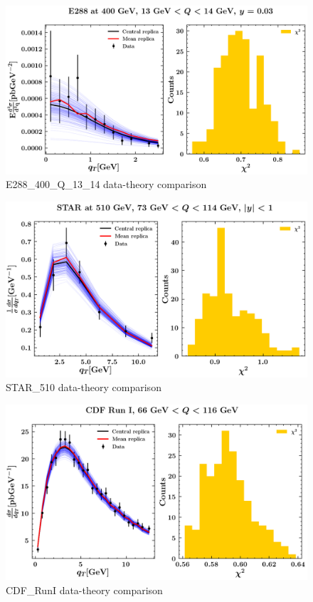 \documentclass[
]{article}
\begin{document}
\begin{figure}
\centering
\includegraphics{pngplots/E288_400_Q_13_14.png}
\caption{E288\_400\_Q\_13\_14 data-theory comparison}
\end{figure}

\begin{figure}
\centering
\includegraphics{pngplots/STAR_510.png}
\caption{STAR\_510 data-theory comparison}
\end{figure}

\begin{figure}
\centering
\includegraphics{pngplots/CDF_RunI.png}
\caption{CDF\_RunI data-theory comparison}
\end{figure}
\end{document}

